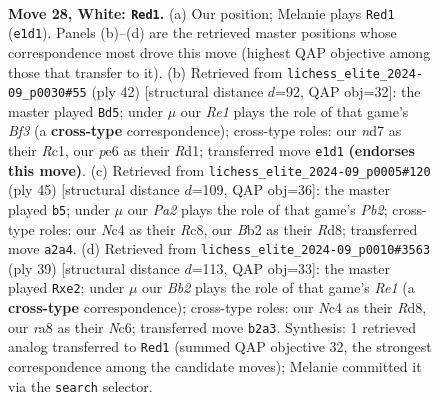 \documentclass[11pt]{article}
\begin{document}
\begin{figure}[p]
\label{fig:thought-m52}
\end{figure}

\clearpage

\begin{figure}[p]\centering
\begin{subfigure}{0.46\textwidth}\centering
\resizebox{\linewidth}{!}{%
\newchessgame
\chessboard[
  setfen={rnb5/1p1n2k1/p3ppp1/3r3p/1bN5/1P2P1PP/PBB1PK2/R3R3 w - - 1 28},
  showmover=false,
  pgfstyle=straightmove, color=movearrow, markmove={e1-d1}
]}
\caption{}
\end{subfigure}\hfill
\begin{subfigure}{0.46\textwidth}\centering
\resizebox{\linewidth}{!}{%
\newchessgame
\chessboard[
  setfen={4nr1k/1prn2p1/p2pb2p/P3p3/2P5/1N2NB2/1P3PPP/2RR2K1 w - - 3 22},
  showmover=false,
  pgfstyle=straightmove, color=movearrow, markmove={f3-d5}
]}
\caption{}
\end{subfigure}
\\[4pt]
\begin{subfigure}{0.46\textwidth}\centering
\resizebox{\linewidth}{!}{%
\newchessgame
\chessboard[
  setfen={2rr2k1/pp2pp1p/5bp1/8/1BPPbn2/1P3N1P/R4PP1/3RN1K1 b - - 8 23},
  showmover=false,
  pgfstyle=straightmove, color=movearrow, markmove={b7-b5}
]}
\caption{}
\end{subfigure}\hfill
\begin{subfigure}{0.46\textwidth}\centering
\resizebox{\linewidth}{!}{%
\newchessgame
\chessboard[
  setfen={3rr1k1/pp3pp1/1bn4p/2N4b/8/1NR3PP/PP2PPB1/4R1K1 b - - 0 20},
  showmover=false,
  pgfstyle=straightmove, color=movearrow, markmove={e8-e2}
]}
\caption{}
\end{subfigure}
\caption{\textbf{Move 28, White: \texttt{Red1}.} (a) Our position; Melanie plays \texttt{Red1} (\texttt{e1d1}). Panels (b)--(d) are the retrieved master positions whose correspondence most drove this move (highest QAP objective among those that transfer to it). (b) Retrieved from \texttt{lichess\_elite\_2024-09\_p0030\#55} (ply 42) [structural distance $d$=92, QAP obj=32]: the master played \texttt{Bd5}; under $\mu$ our \emph{Re1} plays the role of that game's \emph{Bf3} (a \textbf{cross-type} correspondence); cross-type roles: our \emph{n}d7 as their \emph{R}c1, our \emph{p}e6 as their \emph{R}d1; transferred move \texttt{e1d1} \textbf{(endorses this move)}. (c) Retrieved from \texttt{lichess\_elite\_2024-09\_p0005\#120} (ply 45) [structural distance $d$=109, QAP obj=36]: the master played \texttt{b5}; under $\mu$ our \emph{Pa2} plays the role of that game's \emph{Pb2}; cross-type roles: our \emph{N}c4 as their \emph{R}c8, our \emph{B}b2 as their \emph{R}d8; transferred move \texttt{a2a4}. (d) Retrieved from \texttt{lichess\_elite\_2024-09\_p0010\#3563} (ply 39) [structural distance $d$=113, QAP obj=33]: the master played \texttt{Rxe2}; under $\mu$ our \emph{Bb2} plays the role of that game's \emph{Re1} (a \textbf{cross-type} correspondence); cross-type roles: our \emph{N}c4 as their \emph{R}d8, our \emph{r}a8 as their \emph{N}c6; transferred move \texttt{b2a3}. Synthesis: 1 retrieved analog transferred to \texttt{Red1} (summed QAP objective 32, the strongest correspondence among the candidate moves); Melanie committed it via the \texttt{search} selector.}

\end{figure}
\end{document}
